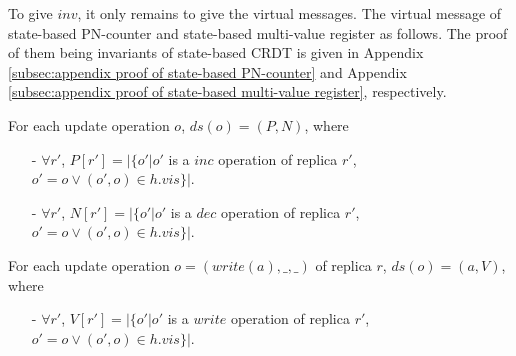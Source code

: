 To give $\mathit{inv}$, it only remains to give the virtual messages. The virtual message of state-based PN-counter and state-based multi-value register as follows. The proof of them being invariants of state-based CRDT is given in Appendix \ref{subsec:appendix proof of state-based PN-counter} and Appendix \ref{subsec:appendix proof of state-based multi-value register}, respectively.

\begin{example}
\label{example:virtual messagess of state-based PN-counter}

For each update operation $o$, $\mathit{ds}(o) = (P,N)$, where

\begin{itemize}
\setlength{\itemsep}{0.5pt}
\item[-] $\forall r'$, $P[r'] = \vert \{ o' \vert o'$ is a $\mathit{inc}$ operation of replica $r'$, $o' = o \vee (o',o) \in h.\mathit{vis} \} \vert$.

\item[-] $\forall r'$, $N[r'] = \vert \{ o' \vert o'$ is a $\mathit{dec}$ operation of replica $r'$, $o' = o \vee (o',o) \in h.\mathit{vis} \} \vert$.
\end{itemize}
\end{example}

\begin{example}
\label{example:virtual messages of state-based multi-value register}

For each update operation $o = (\mathit{write}(a),\_,\_)$ of replica $r$, $\mathit{ds}(o) = (a,V)$, where

\begin{itemize}
\setlength{\itemsep}{0.5pt}
\item[-] $\forall r'$, $V[r'] = \vert \{ o' \vert o'$ is a $\mathit{write}$ operation of replica $r'$, $o' = o \vee (o',o) \in h.\mathit{vis} \} \vert$.
\end{itemize}
\end{example}









